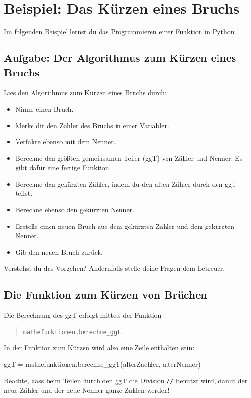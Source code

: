 \section{Beispiel: Das Kürzen eines Bruchs}

Im folgenden Beispiel lernst du das Programmieren einer Funktion in Python.

\subsection*{Aufgabe: Der Algorithmus zum Kürzen eines Bruchs}

Lies den Algorithmus zum Kürzen eines Bruchs durch:

\begin{itemize}
	\item Nimm einen Bruch.
	\item Merke dir den Zähler des Bruchs in einer Variablen.
	\item Verfahre ebenso mit dem Nenner.
	\item Berechne den größten gemeinsamen Teiler (ggT) von Zähler und Nenner. Es gibt dafür eine fertige Funktion.
	\item Berechne den gekürzten Zähler, indem du den alten Zähler durch den ggT teilst. 
	\item Berechne ebenso den gekürzten Nenner.
	\item Erstelle einen neuen Bruch aus dem gekürzten Zähler und dem gekürzten Nenner.
	\item Gib den neuen Bruch zurück.
\end{itemize}

Verstehst du das Vorgehen? Andernfalls stelle deine Fragen dem Betreuer.

\subsection*{Die Funktion zum Kürzen von Brüchen}
\label{sec:FunktionKuerzen}

Die Berechnung des ggT erfolgt mittels der Funktion
\begin{quote}
\texttt{mathefunktionen.berechne\_ggT}.
\end{quote}
In der Funktion zum Kürzen wird also eine Zeile enthalten sein:

\begin{codePython}
ggT = mathefunktionen.berechne_ggT(alterZaehler, alterNenner)
\end{codePython}

Beachte, dass beim Teilen durch den ggT die Division \texttt{//} benutzt wird, damit der neue Zähler und der neue Nenner ganze Zahlen werden!

